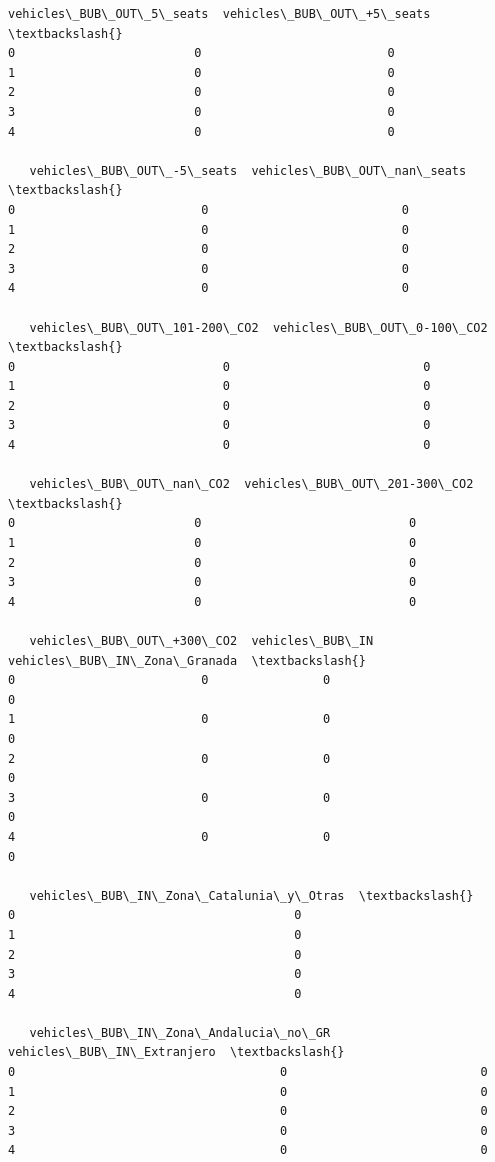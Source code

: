 \documentclass[11pt]{article}
\begin{document}
\begin{tcolorbox}[breakable, size=fbox, boxrule=.5pt, pad at break*=1mm, opacityfill=0]
\begin{Verbatim}[commandchars=\\\{\}]
   vehicles\_BUB\_OUT\_5\_seats  vehicles\_BUB\_OUT\_+5\_seats  \textbackslash{}
0                         0                          0
1                         0                          0
2                         0                          0
3                         0                          0
4                         0                          0

   vehicles\_BUB\_OUT\_-5\_seats  vehicles\_BUB\_OUT\_nan\_seats  \textbackslash{}
0                          0                           0
1                          0                           0
2                          0                           0
3                          0                           0
4                          0                           0

   vehicles\_BUB\_OUT\_101-200\_CO2  vehicles\_BUB\_OUT\_0-100\_CO2  \textbackslash{}
0                             0                           0
1                             0                           0
2                             0                           0
3                             0                           0
4                             0                           0

   vehicles\_BUB\_OUT\_nan\_CO2  vehicles\_BUB\_OUT\_201-300\_CO2  \textbackslash{}
0                         0                             0
1                         0                             0
2                         0                             0
3                         0                             0
4                         0                             0

   vehicles\_BUB\_OUT\_+300\_CO2  vehicles\_BUB\_IN  vehicles\_BUB\_IN\_Zona\_Granada  \textbackslash{}
0                          0                0                             0
1                          0                0                             0
2                          0                0                             0
3                          0                0                             0
4                          0                0                             0

   vehicles\_BUB\_IN\_Zona\_Catalunia\_y\_Otras  \textbackslash{}
0                                       0
1                                       0
2                                       0
3                                       0
4                                       0

   vehicles\_BUB\_IN\_Zona\_Andalucia\_no\_GR  vehicles\_BUB\_IN\_Extranjero  \textbackslash{}
0                                     0                           0
1                                     0                           0
2                                     0                           0
3                                     0                           0
4                                     0                           0


\end{Verbatim}
\end{tcolorbox}
\end{document}
